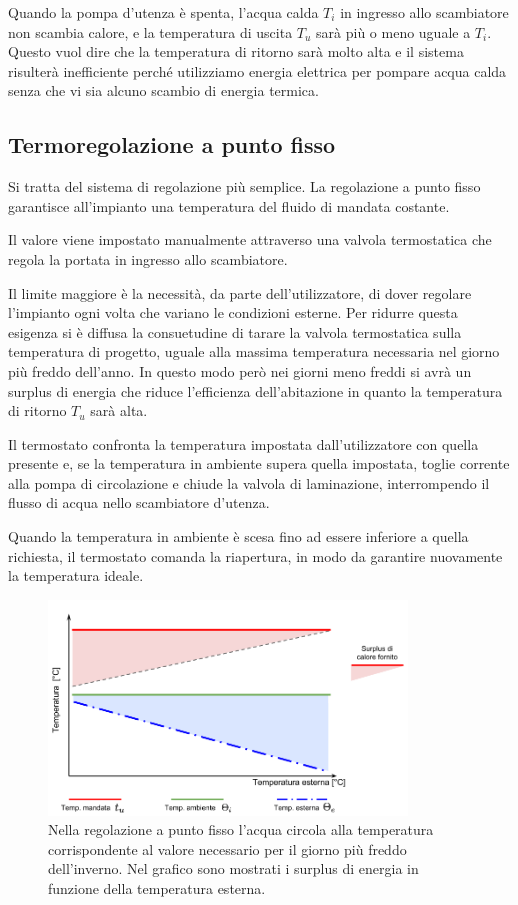 \documentclass[laurea,oneside,11pt]{USiena_tesiLM3}
\begin{document}
Quando la pompa d'utenza è spenta, l'acqua calda $T_i$ in ingresso allo scambiatore non scambia calore, e la temperatura di uscita $T_u$ sarà più o meno uguale a $T_i$. Questo vuol dire che la temperatura di ritorno sarà molto alta e il sistema risulterà inefficiente perché utilizziamo energia elettrica per pompare acqua calda senza che vi sia alcuno scambio di energia termica.


\subsection{Termoregolazione a punto fisso}
Si tratta del sistema di regolazione più semplice. La regolazione a punto fisso garantisce all'impianto una temperatura del fluido di mandata costante. 

Il valore viene impostato manualmente attraverso una valvola termostatica che regola la portata in ingresso allo scambiatore.  

Il limite maggiore è la necessità, da parte dell'utilizzatore, di dover regolare l'impianto ogni volta che variano le condizioni esterne. Per ridurre questa esigenza si è diffusa la consuetudine di tarare la valvola termostatica sulla temperatura di progetto, uguale alla massima temperatura necessaria nel giorno più freddo dell'anno. In questo modo però nei giorni meno freddi si avrà un surplus di energia che riduce l'efficienza dell'abitazione in quanto la temperatura di ritorno $T_u$ sarà alta.

Il termostato confronta la temperatura impostata dall'utilizzatore con quella presente e, se la temperatura in ambiente supera quella impostata, toglie corrente alla pompa di circolazione e chiude la valvola di laminazione, interrompendo il flusso di acqua nello scambiatore d'utenza. 

Quando la temperatura in ambiente è scesa fino ad essere inferiore a quella richiesta, il termostato comanda la riapertura, in modo da garantire nuovamente la temperatura ideale.

\begin{figure}[!ht]
\centering
\includegraphics[width=0.85\textwidth]{figure/surplus} 
\caption{Nella regolazione a punto fisso l'acqua circola alla temperatura corrispondente al valore necessario per il giorno più freddo dell'inverno. Nel grafico sono mostrati i surplus di energia in funzione della temperatura esterna.}
\label{fig:surplus}
\end{figure}
\end{document}
